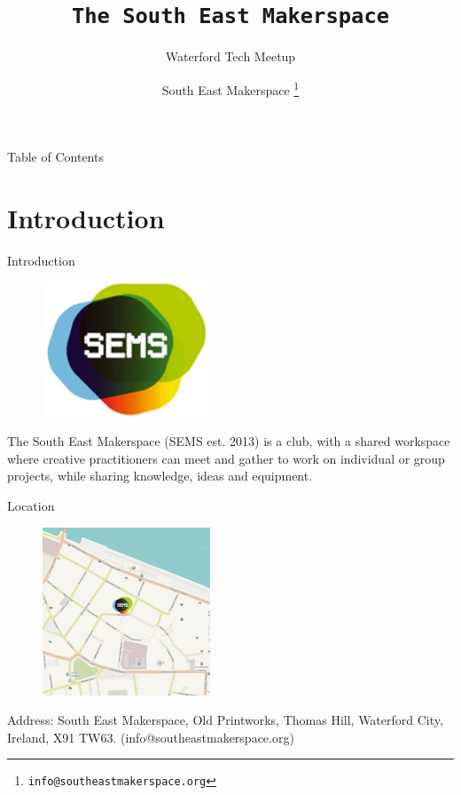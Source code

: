 \documentclass{beamer}
\title{\texttt{The South East Makerspace}}
\subtitle{Waterford Tech Meetup}
\author{South East Makerspace \footnote{\texttt{info@southeastmakerspace.org}}}
\begin{document}
\begin{frame}
  \maketitle
\end{frame}


\begin{frame}{Table of Contents}
  \tableofcontents
\end{frame}

\section{Introduction}
\begin{frame}{Introduction}
%
\begin{figure}
	\centering
	\includegraphics[width=5cm]{images/test}
	\label{fig:logo}
\end{figure}
%

The South East Makerspace (SEMS est. 2013) is a club, with a shared workspace where creative practitioners can meet and gather to work on individual or group projects, while sharing knowledge, ideas and equipment.
\end{frame}

\begin{frame}{Location}
	\begin{figure}
		\centering
		\includegraphics[width=5cm]{images/sems_1}
		\label{fig:logo1}
	\end{figure}
	
	Address: South East Makerspace, Old Printworks, Thomas Hill, Waterford City, Ireland, X91 TW63. (info@southeastmakerspace.org)
\end{frame}
\end{document}
